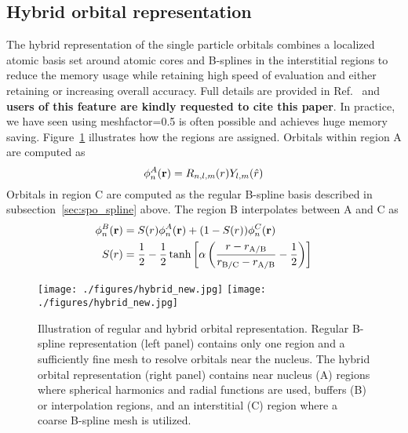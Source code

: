 \subsection{Hybrid orbital representation}
\label{sec:spo_hybrid}
The hybrid representation of the single particle orbitals combines a localized atomic basis set around atomic cores and B-splines in the interstitial regions to reduce the memory usage while retaining high speed of evaluation and either retaining or increasing overall accuracy. Full details are provided in Ref.~\cite{Luo2018hyb} and \textbf{users of this feature are kindly requested to cite this paper}.
In practice, we have seen using meshfactor=0.5 is often possible and achieves huge memory saving.
Figure~\ref{fig:hybridrep} illustrates how the regions are assigned. Orbitals within region A are computed as
\[
  \phi^A_n({\bf r})=R_{n,l,m}(r)Y_{l,m}(\hat{r})
\]
Orbitals in region C are computed as the regular B-spline basis described in subsection~\ref{sec:spo_spline} above. The region B interpolates between A and C as
\begin{align}
  \phi^B_n({\bf r}) &= S(r) \phi^A_n({\bf r}) + (1-S(r))\phi^C_n({\bf r}) \\
                S(r) &= \frac{1}{2}-\frac{1}{2}\tanh\left[\alpha\left(\frac{r-r_{\rm A/B}}{r_{\rm B/C}-r_{\rm A/B}}-\frac{1}{2}\right)\right]
\end{align}

\begin{figure}
\centering
\texttt{[image: ./figures/hybrid\_new.jpg]}
\qquad
\texttt{[image: ./figures/hybrid\_new.jpg]}
\caption{Illustration of regular and hybrid orbital representation. Regular B-spline representation (left panel) contains only one region and a sufficiently fine mesh to resolve orbitals near the nucleus. The hybrid orbital representation (right panel) contains near nucleus (A) regions where spherical harmonics and radial functions are used, buffers (B) or interpolation regions, and an interstitial (C) region where a coarse B-spline mesh is utilized.}
\label{fig:hybridrep}
\end{figure}

